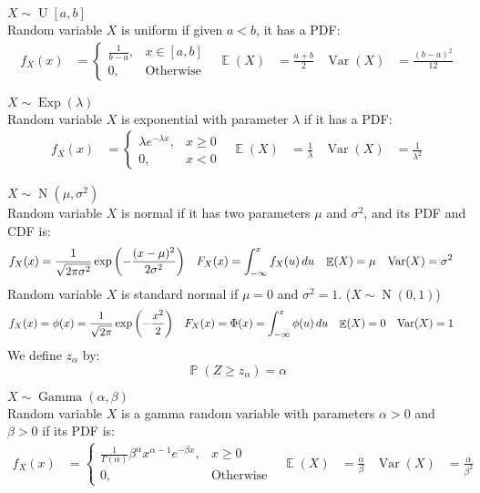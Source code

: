 \documentclass{huhtakm-template-book-v2}
\DeclareMathOperator{\prob}{\mathbb{P}}
\DeclareMathOperator{\E}{\mathbb{E}}
\DeclareMathOperator{\Var}{Var}
\DeclareMathOperator{\Exp}{Exp}
\DeclareMathOperator{\N}{N}
\DeclareMathOperator{\U}{U}
\DeclareMathOperator{\Gam}{Gamma}
\begin{document}
\begin{eg} $X\sim\U[a,b]$\\
	Random variable $X$ is uniform if given $a<b$, it has a PDF:
	\begin{align*}
		f_{X}(x)&=\begin{cases}
			\frac{1}{b-a}, &x\in[a,b]\\
			0, &\text{Otherwise}
		\end{cases} & \E(X)&=\frac{a+b}{2} & \Var(X)&=\frac{(b-a)^{2}}{12}
	\end{align*}
\end{eg}
\begin{eg} $X\sim\Exp(\lambda)$\\
	Random variable $X$ is exponential with parameter $\lambda$ if it has a PDF:
	\begin{align*}
		f_{X}(x)&=\begin{cases}
			\lambda e^{-\lambda x}, &x\geq 0\\
			0, &x<0
		\end{cases} & \E(X)&=\frac{1}{\lambda} & \Var(X)&=\frac{1}{\lambda^{2}}
	\end{align*}
\end{eg}
\begin{eg} $X\sim\N(\mu,\sigma^{2})$\\
	Random variable $X$ is normal if it has two parameters $\mu$ and $\sigma^{2}$, and its PDF and CDF is:
	\begin{align*}
		f_{X}(x)&=\frac{1}{\sqrt{2\pi\sigma^{2}}}\exp\left(-\frac{(x-\mu)^{2}}{2\sigma^{2}}\right) & F_{X}(x)&=\intlu{-\infty}{x}f_{X}(u)\,du & \E(X)&=\mu & \Var(X)&=\sigma^{2}
	\end{align*}
	Random variable $X$ is standard normal if $\mu=0$ and $\sigma^{2}=1$. ($X\sim\N(0,1)$)
	\begin{align*}
		f_{X}(x)&=\phi(x)=\frac{1}{\sqrt{2\pi}}\exp\left(-\frac{x^{2}}{2}\right) & F_{X}(x)&=\Phi(x)=\intlu{-\infty}{x}\phi(u)\,du & \E(X)&=0 & \Var(X)&=1
	\end{align*}
	We define $z_{\alpha}$ by:
	\begin{equation*}
		\prob(Z\geq z_{\alpha})=\alpha
	\end{equation*}
\end{eg}
\begin{eg} $X\sim\Gam(\alpha,\beta)$\\
	Random variable $X$ is a gamma random variable with parameters $\alpha>0$ and $\beta>0$ if its PDF is:
	\begin{align*}
		f_{X}(x)&=\begin{cases}
			\frac{1}{\Gamma(\alpha)}\beta^{\alpha}x^{\alpha-1}e^{-\beta x}, &x\geq 0\\
			0, &\text{Otherwise}
		\end{cases} & \E(X)&=\frac{\alpha}{\beta} & \Var(X)&=\frac{\alpha}{\beta^{2}}
	\end{align*}
\end{eg}
\end{document}
